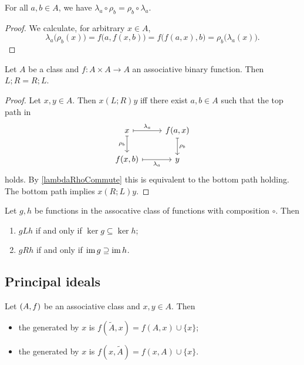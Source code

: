 \begin{lemma} \label{lambdaRhoCommute}
For all $a,b\in A$, we have $\lambda_a\circ \rho_b = \rho_b \circ \lambda_a$.
\end{lemma}
\begin{proof}
We calculate, for arbitrary $x\in A$,
\[ \lambda_a\big(\rho_b(x)\big) = f\big(a, f(x,b)\big) = f\big(f(a,x), b\big)  = \rho_b\big(\lambda_a(x)\big). \]
\end{proof}
\begin{corollary} \label{LRcommute}
Let $A$ be a class and $f: A\times A \to A$ an associative binary function. Then $L;R = R;L$.
\end{corollary}
\begin{proof}
Let $x,y\in A$. Then $x(L;R)y$ iff there exist $a,b\in A$ such that the top path in
\[ \begin{tikzcd}
x \ar[r, maps to, "\lambda_a"] \ar[d, maps to, swap, "\rho_b"] & f(a, x) \ar[d, maps to, "\rho_b"] \\
f(x, b) \ar[r, maps to, swap, "\lambda_a"] & y
\end{tikzcd} \]
holds. By \ref{lambdaRhoCommute} this is equivalent to the bottom path holding. The bottom path implies $x(R;L)y$.
\end{proof}

\begin{proposition} \label{functionsLeftRightRelations}
Let $g,h$ be functions in the assocative class of functions with composition $\circ$. Then
\begin{enumerate}
\item $gLh$ \textup{if and only if} $\ker g \subseteq \ker h$;
\item $gRh$ \textup{if and only if} $\operatorname{im} g \supseteq \operatorname{im} h$. 
\end{enumerate}
\end{proposition}

\subsection{Principal ideals}
\begin{definition}
Let $\left( A, f \right)$ be an associative class and $x, y\in A$. Then
\begin{itemize}
\item the  generated by $x$ is $f(\widetilde{A}, x) = f(A, x)\cup \{x\}$;
\item the  generated by $x$ is $f(x, \widetilde{A}) = f(x,A)\cup \{x\}$.
\end{itemize}
\end{definition}

